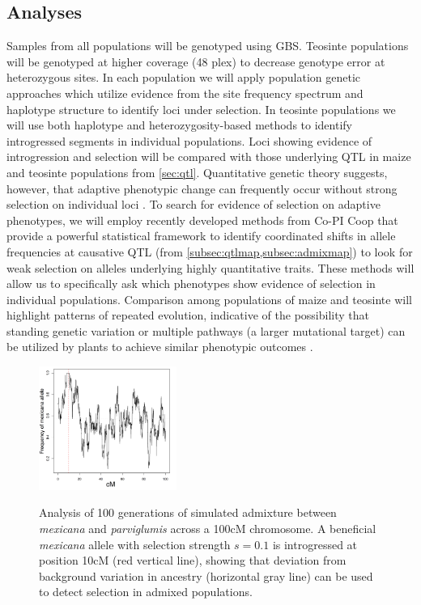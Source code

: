 \subsection{Analyses}
Samples from all populations will be genotyped using GBS.  Teosinte populations will be genotyped at higher coverage (48 plex) to decrease genotype error at heterozygous sites. In each population we will apply population genetic approaches which utilize evidence from the site frequency spectrum \citep{nielsen2005genomic} and haplotype structure \citep{voight2006map} to identify loci under selection.  In teosinte populations we will use both haplotype \citep{price2009sensitive} and heterozygosity-based \citep{Geneva2014} methods to identify introgressed segments in individual populations.  Loci showing evidence of introgression and selection will be compared with those underlying QTL in maize and teosinte populations from \ref{sec:qtl}.  Quantitative genetic theory suggests, however, that adaptive phenotypic change can frequently occur without strong selection on individual loci \citep{le2012genetic}.  To search for evidence of selection on adaptive phenotypes, we will employ recently developed methods from Co-PI Coop \citep{Berg2013} that provide a powerful statistical framework to identify coordinated shifts in allele frequencies at causative QTL (from \ref{subsec:qtlmap,subsec:admixmap}) to look for weak selection on alleles underlying highly quantitative traits. These methods will allow us to specifically ask which phenotypes show evidence of selection in individual populations.  Comparison among populations of maize and teosinte will highlight patterns of repeated evolution, indicative of the possibility that standing genetic variation or multiple pathways (a larger mutational target) can be utilized by plants to achieve similar phenotypic outcomes \citep{Ralph2010a}.

\begin{figure}
  \centering
  \caption{Analysis of 100 generations of simulated admixture between \emph{mexicana} and \emph{parviglumis} across a 100cM chromosome.   A  beneficial \emph{mexicana} allele with selection strength $s=0.1$ is introgressed at position 10cM (red vertical line), showing that  deviation from background variation in ancestry (horizontal gray line) can be used to detect selection in admixed populations. } 
   \includegraphics[width=0.4\textwidth]{admix.png}
\label{fig:yaniv}
\end{figure}

